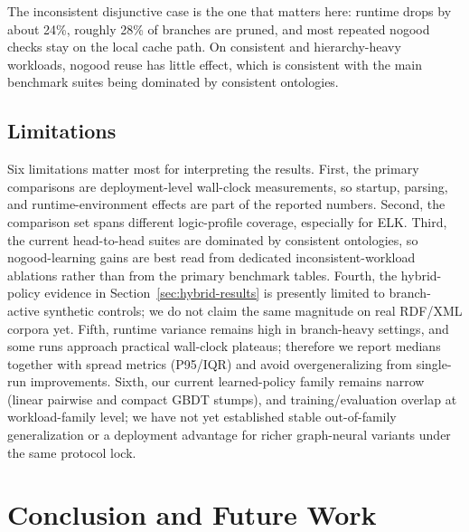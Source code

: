 \documentclass[preprint,12pt,times]{elsarticle}
\begin{document}
The inconsistent disjunctive case is the one that matters here: runtime drops by about 24\%, roughly 28\% of branches are pruned, and most repeated nogood checks stay on the local cache path. On consistent and hierarchy-heavy workloads, nogood reuse has little effect, which is consistent with the main benchmark suites being dominated by consistent ontologies.

\subsection{Limitations}
\label{sec:limitations}

Six limitations matter most for interpreting the results. First, the primary comparisons are deployment-level wall-clock measurements, so startup, parsing, and runtime-environment effects are part of the reported numbers. Second, the comparison set spans different logic-profile coverage, especially for ELK. Third, the current head-to-head suites are dominated by consistent ontologies, so nogood-learning gains are best read from dedicated inconsistent-workload ablations rather than from the primary benchmark tables. Fourth, the hybrid-policy evidence in Section~\ref{sec:hybrid-results} is presently limited to branch-active synthetic controls; we do not claim the same magnitude on real RDF/XML corpora yet. Fifth, runtime variance remains high in branch-heavy settings, and some runs approach practical wall-clock plateaus; therefore we report medians together with spread metrics (P95/IQR) and avoid overgeneralizing from single-run improvements. Sixth, our current learned-policy family remains narrow (linear pairwise and compact GBDT stumps), and training/evaluation overlap at workload-family level; we have not yet established stable out-of-family generalization or a deployment advantage for richer graph-neural variants under the same protocol lock.

\section{Conclusion and Future Work}
\label{sec:conclusion}
\end{document}
